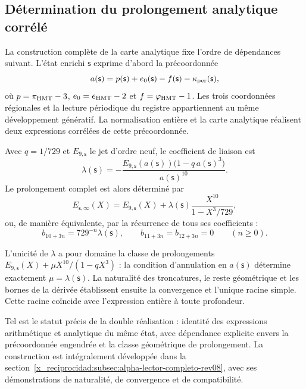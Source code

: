 \subsection*{Détermination du prolongement analytique corrélé}

La construction complète de la carte analytique fixe l’ordre de dépendances suivant. L’état enrichi $\mathsf s$ exprime d’abord la précoordonnée
\[
 a(\mathsf s)=p(\mathsf s)+e_0(\mathsf s)-f(\mathsf s)
              -\kappa_{\rm per}(\mathsf s),
\]
où $p=\pi_{\rm HMT}-3$, $e_0=e_{\rm HMT}-2$ et $f=\varphi_{\rm HMT}-1$. Les trois coordonnées régionales et la lecture périodique du registre appartiennent au même développement génératif. La normalisation entière et la carte analytique réalisent deux expressions corrélées de cette précoordonnée.

Avec $q=1/729$ et $E_{9,\mathsf s}$ le jet d’ordre neuf, le coefficient de liaison est
\[
 \lambda(\mathsf s)=
 -\frac{E_{9,\mathsf s}(a(\mathsf s))
         \bigl(1-q\,a(\mathsf s)^3\bigr)}{a(\mathsf s)^{10}}.
\]
Le prolongement complet est alors déterminé par
\[
 E_{\mathsf s,\infty}(X)=E_{9,\mathsf s}(X)
      +\lambda(\mathsf s)\frac{X^{10}}{1-X^3/729},
\]
ou, de manière équivalente, par la récurrence de tous ses coefficients :
\[
 b_{10+3n}=729^{-n}\lambda(\mathsf s),\qquad
 b_{11+3n}=b_{12+3n}=0\qquad(n\geq0).
\]

L’unicité de $\lambda$ a pour domaine la classe de prolongements $E_{9,\mathsf s}(X)+\mu X^{10}/(1-qX^3)$ : la condition d’annulation en $a(\mathsf s)$ détermine exactement $\mu=\lambda(\mathsf s)$. La naturalité des troncatures, le reste géométrique et les bornes de la dérivée établissent ensuite la convergence et l’unique racine simple. Cette racine coïncide avec l’expression entière à toute profondeur.

Tel est le statut précis de la double réalisation : identité des expressions arithmétique et analytique du même état, avec dépendance explicite envers la précoordonnée engendrée et la classe géométrique de prolongement. La construction est intégralement développée dans la section~\ref{x_reciprocidad:subsec:alpha-lector-completo-rev08}, avec ses démonstrations de naturalité, de convergence et de compatibilité.
